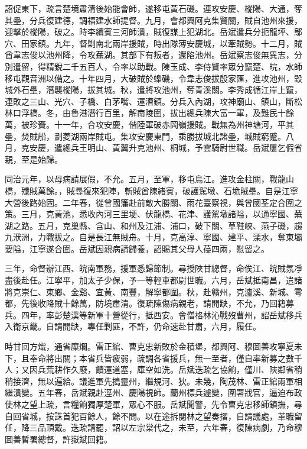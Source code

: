 \begin{pinyinscope}
詔促東下，疏言楚境肅清後始能會師，遂移屯黃石磯。連攻安慶、樅陽、大通，奪其壘，分兵復建德，調福建水師提督。九月，會都興阿克集賢關，賊自池州來援，迎擊於樅陽，破之。時李續賓三河師潰，賊復謀上犯湖北。岳斌遣兵分扼龍坪、鄔穴、田家鎮。九年，督剿南北兩岸援賊，時出隊薄安慶城，以牽賊勢。十二月，賊酋韋志俊以池州降，令攻蕪湖。其部下有叛者，還陷池州。岳斌察志俊無異志，分別遣留，得精銳二千五百人，令率以助戰。陳玉成、李侍賢率眾分竄楚、皖，水師移屯觀音洲以備之。十年四月，大破賊於蟂磯，令韋志俊拔殷家匯，進攻池州，毀城外石壘，潛襲樅陽，拔其城。秋，遣將攻池州，奪青溪關。李秀成循江岸上竄，連敗之三山、光穴、子橋、白茅嘴、運漕鎮。分兵入內湖，攻神廟山、鎮山，斷松林口浮橋。冬，由魯港潛行百里，解南陵圍，拔出總兵陳大富一軍，及難民十餘萬，被珍賚。十一年，合攻安慶，偕陸軍破赤岡嶺援賊。戰無為州神塘河，平其壘，焚賊船，劃菱湖兩岸賊屯。集攻安慶東門，乘勝拔城北諸壘，城賊窮蹙。八月，克安慶，遣總兵王明山、黃翼升克池州、桐城，予雲騎尉世職。岳斌屢乞假省親，至是始歸。

同治元年，以母病請展假，不允。五月，至軍，移屯烏江。進攻金柱關，戰龍山橋，殲賊萬餘。，賊尋復來犯陣，斬賊酋陳緒賓，破護駕墩、石垝賊壘。自是江寧大營後路始固。二年春，從曾國籓赴前敵大勝關、雨花臺察視，與曾國荃定合圍之策。三月，克黃池，悉收內河三里埂、伏龍橋、花津、護駕墩諸隘，以通寧國、蕪湖之路。五月，克巢縣、含山、和州及江浦、浦口，破下關、草鞋峽、燕子磯，趨九洑洲，力戰拔之。自是長江無賊舟。十月，克高淳、寧國、建平、溧水，奪東壩要隘，江寧遂合圍。岳斌因親病請歸養，詔賜其父母人葠四兩，慰留之。

三年，命督辦江西、皖南軍務，援軍悉歸節制。尋授陜甘總督，命俟江、皖賊氛凈盡後赴任。江寧平，加太子少保，予一等輕車都尉世職。六月，岳斌抵南昌，遣諸將克崇仁、東鄉、金谿、宜黃、南豐，解寧都圍。秋，赴贛州，克瀘溪、新城、雩都，先後收降賊十餘萬，防境肅清。復疏陳傷病親老，請開缺，不允，乃回籍募兵。四年，率彭楚漢等新軍十營從行，抵西安。會僧格林沁戰歿曹州，詔岳斌移兵入衛京畿。自請開缺，專任剿匪，不許，仍命速赴甘肅，六月，履任。

時甘回方熾，通省糜爛。雷正綰、曹克忠新敗於金積堡，都興阿、穆圖善攻寧夏未下，且奉命將出關；本省兵皆疲弱，疏調各省援兵，無一至者，僅自率新募之數千人；又因兵荒耕作久廢，饋運道塞，庫空如洗。岳斌迭疏乞協餉，僅川、陜鄰省稍稍接濟，無以遍給。議進軍先搗靈州，繼規河、狄。未幾，陶茂林、雷正綰兩軍相繼潰變。五年春，岳斌親赴涇州、慶陽視師。蘭州標兵遽變，圍署戕官，逼迫布政使林之望上疏，言糧餉獨厚楚軍，眾心不服。岳斌聞警，先令曹克忠移師鎮撫，尋自回省城，按誅首犯百餘人，餘不問。以在途拆閱林之望奏摺，自請議處，革職留任，降三品頂戴。迭疏請罷，詔以左宗棠代之，未至，六年春，復陳病劇，乃命穆圖善暫署總督，許嶽斌回籍。


\end{pinyinscope}
